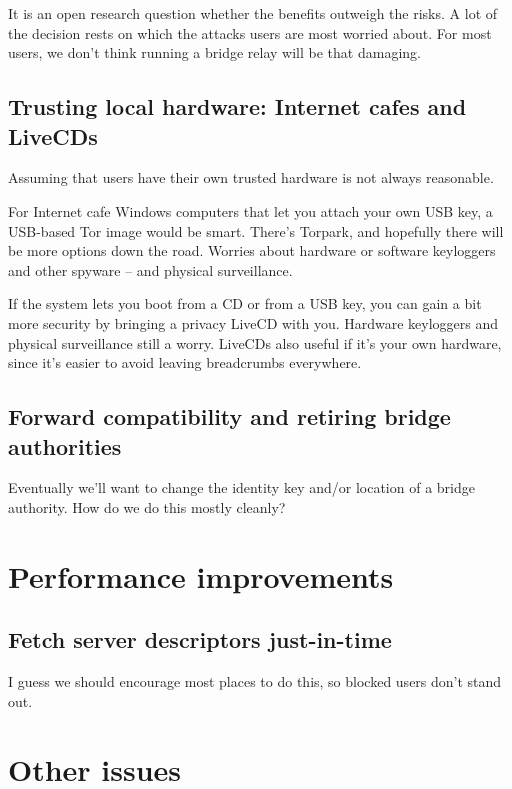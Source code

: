 \documentclass{llncs}
\begin{document}
It is an open research question whether the benefits outweigh the risks. A
lot of the decision rests on which the attacks users are most worried
about. For most users, we don't think running a bridge relay will be
that damaging.

\subsection{Trusting local hardware: Internet cafes and LiveCDs}
\label{subsec:cafes-and-livecds}

Assuming that users have their own trusted hardware is not
always reasonable.

For Internet cafe Windows computers that let you attach your own USB key,
a USB-based Tor image would be smart. There's Torpark, and hopefully
there will be more options down the road. Worries about hardware or
software keyloggers and other spyware -- and physical surveillance.

If the system lets you boot from a CD or from a USB key, you can gain
a bit more security by bringing a privacy LiveCD with you. Hardware
keyloggers and physical surveillance still a worry. LiveCDs also useful
if it's your own hardware, since it's easier to avoid leaving breadcrumbs
everywhere.

\subsection{Forward compatibility and retiring bridge authorities}

Eventually we'll want to change the identity key and/or location
of a bridge authority. How do we do this mostly cleanly?


\section{Performance improvements}

\subsection{Fetch server descriptors just-in-time}

I guess we should encourage most places to do this, so blocked
users don't stand out.

\section{Other issues}
\end{document}
